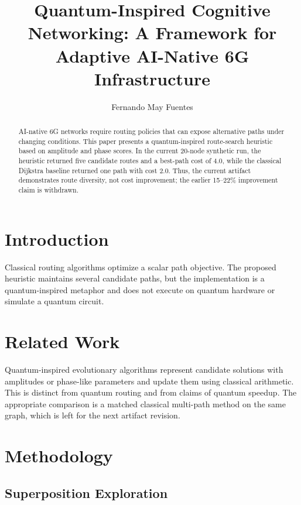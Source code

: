 \documentclass[sigconf]{acmart}
\title{Quantum-Inspired Cognitive Networking: A Framework for Adaptive AI-Native 6G Infrastructure}
\author{Fernando May Fuentes}
\affiliation{
  \institution{Instituto Polit\'{e}cnico Nacional}
  \city{Ciudad de M\'{e}xico}
  \country{M\'{e}xico}
}
\begin{document}
\begin{abstract}
AI-native 6G networks require routing policies that can expose alternative paths under changing conditions. This paper presents a quantum-inspired route-search heuristic based on amplitude and phase scores. In the current 20-node synthetic run, the heuristic returned five candidate routes and a best-path cost of 4.0, while the classical Dijkstra baseline returned one path with cost 2.0. Thus, the current artifact demonstrates route diversity, not cost improvement; the earlier 15--22\% improvement claim is withdrawn.
\end{abstract}


\maketitle

\section{Introduction}

Classical routing algorithms optimize a scalar path objective. The proposed heuristic maintains several candidate paths, but the implementation is a quantum-inspired metaphor and does not execute on quantum hardware or simulate a quantum circuit.

\section{Related Work}

Quantum-inspired evolutionary algorithms represent candidate solutions with amplitudes or phase-like parameters and update them using classical arithmetic. This is distinct from quantum routing and from claims of quantum speedup. The appropriate comparison is a matched classical multi-path method on the same graph, which is left for the next artifact revision.

\section{Methodology}

\subsection{Superposition Exploration}
\end{document}
